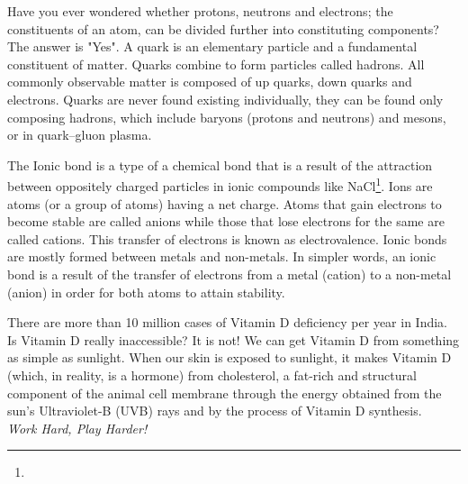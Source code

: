 \documentclass{article}
\begin{document}
\begin{phybox}
Have you ever wondered whether {protons, neutrons and electrons; the constituents of an atom,} can be {divided further} into constituting components? The answer is {"Yes"}. A {quark} is an elementary particle and a fundamental constituent of matter. Quarks combine to form particles called hadrons. All commonly observable matter is composed of {up quarks, down quarks and electrons}. Quarks are never found existing individually, they can be found only composing {hadrons}, which include {baryons} (protons and neutrons) and {mesons}, or in {quark–gluon plasma}.
\end{phybox}
\begin{chembox}
The {Ionic bond} is a type of a {chemical bond} that is a result of the attraction {between oppositely charged particles} in ionic compounds like NaCl\footnote{}. Ions are atoms (or a group of atoms) having a {net charge}. Atoms that {gain electrons} to become {stable} are called {anions} while those that {lose electrons} for the same are called {cations}. This {transfer of electrons} is known as {electrovalence}. Ionic bonds are {mostly} formed {between metals and non-metals}. In simpler words, an ionic bond is a result of the transfer of electrons from a metal (cation) to a non-metal (anion) in order for both atoms to attain stability.
\end{chembox}
\begin{biobox}
There are more than {10 million} cases of {Vitamin D deficiency} per year in India. Is Vitamin D really inaccessible? It is not! We can get Vitamin D from something as simple as {sunlight}. When our skin is exposed to sunlight, it makes Vitamin D (which, in reality, is {a hormone}) from {cholesterol}, a fat-rich and structural component of the animal cell membrane through the {energy} obtained from the sun’s {Ultraviolet-B (UVB)} rays and by the process of {Vitamin D synthesis}.\\
\textit{Work Hard, Play Harder!}
\end{biobox} 
\end{document}
